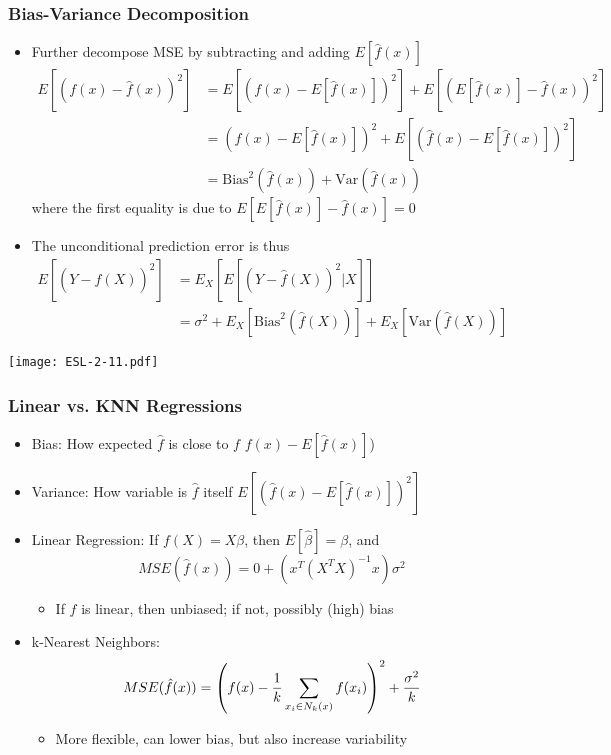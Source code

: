 \documentclass[12pt, xcolor = dvipsnames]{beamer}
\begin{document}
\begin{frame}
\frametitle{Bias-Variance Decomposition}
\begin{itemize}
  \item Further decompose MSE by subtracting and adding $E[\hat{f}(x)]$
  \[\begin{split}
  E[(f(x)-\hat{f}(x))^2]
  &=E[(f(x)-E[\hat{f}(x)])^2]+E[(E[\hat{f}(x)]-\hat{f}(x))^2]\\
  &=(f(x)-E[\hat{f}(x)])^2+E[(\hat{f}(x)-E[\hat{f}(x)])^2] \\
  &=\mathrm{Bias}^2(\hat{f}(x)) + \mathrm{Var}(\hat{f}(x))
  \end{split}\]
  where the first equality is due to $E[E[\hat{f}(x)]-\hat{f}(x)]=0$
  \item The unconditional prediction error is thus
  \[\begin{split}E[(Y-\hat{f}(X))^2]
  &=E_X[E[(Y-\hat{f}(X))^2|X]] \\
  &=\sigma^2+E_X[\mathrm{Bias}^2(\hat{f}(X))]+E_X[\mathrm{Var}(\hat{f}(X))]
  \end{split}\]
\end{itemize}
\end{frame}


\begin{frame}
\begin{center}
  \texttt{[image: ESL-2-11.pdf]}
\end{center}
\end{frame}


\begin{frame}
\frametitle{Linear vs. KNN Regressions}
\begin{itemize}
  \item Bias: How expected $\hat{f}$ is close to $f$ \hfill $f(x)-E[\hat{f}(x)]$)
  \item Variance: How variable is $\hat{f}$ itself \hfill $E[(\hat{f}(x)-E[\hat{f}(x)])^2]$
  \item Linear Regression: If $f(X)=X\beta$, then $E[\hat{\beta}]=\beta$, and
  \[MSE(\hat{f}(x))=0+(x^{T}(X^{T}X)^{-1}x)\sigma^2\]
  \vspace{-8mm}
  \begin{itemize}
    \item If $f$ is linear, then unbiased; if not, possibly (high) bias
  \end{itemize}
  \item k-Nearest Neighbors:
  \[MSE(\hat{f}(x))=\left(f(x)-{1\over k}\sum_{x_i\in N_k(x)}f(x_i)\right)^2+{\sigma^2 \over k}\]
   \vspace{-5mm}
  \begin{itemize}
    \item More flexible, can lower bias, but also increase variability
  \end{itemize}
\end{itemize}
\end{frame}
\end{document}

